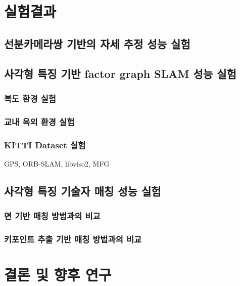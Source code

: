 \documentclass[master,korean,final]{cbnu-ecs}
\begin{document}
\chapter{실험결과}
\section{선분카메라쌍 기반의 자세 추정 성능 실험}
\section{사각형 특징 기반 factor graph SLAM 성능 실험}
\subsection{복도 환경 실험}
\subsection{교내 옥외 환경 실험}
\subsection{KITTI Dataset 실험}
GPS, ORB-SLAM, libviso2, MFG
\section{사각형 특징 기술자 매칭 성능 실험}
\subsection{면 기반 매칭 방법과의 비교}
\subsection{키포인트 추출 기반 매칭 방법과의 비교}

\chapter{결론 및 향후 연구}

\end{document}
